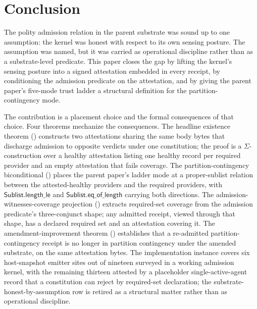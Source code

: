 \section{Conclusion}
\label{sec:conclusion}

The polity admission relation in the parent substrate was sound up to one assumption: the kernel was honest with respect to its own sensing posture. The assumption was named, but it was carried as operational discipline rather than as a substrate-level predicate. This paper closes the gap by lifting the kernel's sensing posture into a signed attestation embedded in every receipt, by conditioning the admission predicate on the attestation, and by giving the parent paper's five-mode trust ladder a structural definition for the partition-contingency mode.

The contribution is a placement choice and the formal consequences of that choice. Four theorems mechanize the consequences. The headline existence theorem () constructs two attestations sharing the same body bytes that discharge admission to opposite verdicts under one constitution; the proof is a $\Sigma$-construction over a healthy attestation listing one healthy record per required provider and an empty attestation that fails coverage. The partition-contingency biconditional () places the parent paper's ladder mode at a proper-sublist relation between the attested-healthy providers and the required providers, with $\mathsf{Sublist.length\_le}$ and $\mathsf{Sublist.eq\_of\_length}$ carrying both directions. The admission-witnesses-coverage projection () extracts required-set coverage from the admission predicate's three-conjunct shape; any admitted receipt, viewed through that shape, has a declared required set and an attestation covering it. The amendment-improvement theorem () establishes that a re-admitted partition-contingency receipt is no longer in partition contingency under the amended substrate, on the same attestation bytes. The implementation instance covers six host-snapshot emitter sites out of nineteen surveyed in a working admission kernel, with the remaining thirteen attested by a placeholder single-active-agent record that a constitution can reject by required-set declaration; the substrate-honest-by-assumption row is retired as a structural matter rather than as operational discipline.

